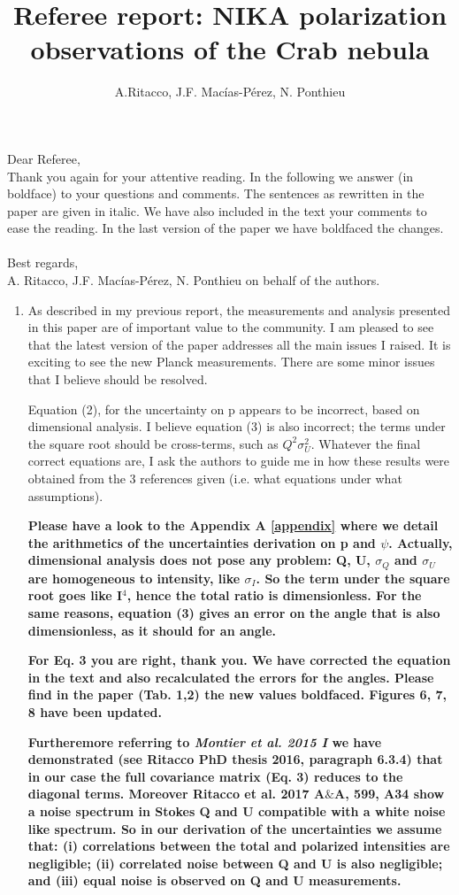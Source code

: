 \documentclass[12pt]{article}
\title{Referee report: NIKA polarization observations of the Crab nebula}
\author{A.Ritacco, J.F. Macías-Pérez, N. Ponthieu}
\begin{document}
\maketitle

\noindent Dear Referee,\\
Thank you again for your attentive reading. 
In the following we answer (in boldface) to your questions and comments.
The sentences as rewritten in the paper are given in italic.
We have also included in the text your comments to ease the reading. 
In the last version of the paper we have boldfaced the changes. \\  \\
Best regards,\\
A. Ritacco, J.F. Macías-Pérez, N. Ponthieu on behalf of the authors.


\begin{enumerate}
    \item 
{
As described in my previous report, the measurements and analysis 
presented in this paper are of important value to the community. I am 
pleased to see that the latest version of the paper addresses all the 
main issues I raised. It is exciting to see the new Planck 
measurements. There are some minor issues that I believe 
should be resolved. 
}

Equation (2), for the uncertainty on p appears to be incorrect, based 
on dimensional analysis. I believe equation (3) is also incorrect; 
the terms under the square root should be cross-terms, such as 
$Q^2\sigma_U^2$. Whatever the final correct equations are, I ask the 
authors to guide me in how these results were obtained from the 3 
references given (i.e. what equations under what assumptions).

{\bf Please have a look to the Appendix A \ref{appendix} where we detail the arithmetics of the uncertainties derivation on p and $\psi$. Actually, dimensional analysis does not pose any problem: Q, U, $\sigma_Q$ and $\sigma_U$ are homogeneous to intensity, like $\sigma_I$. So the term under the square root goes like I$^4$, hence the total ratio is dimensionless. For the same reasons, equation (3) gives an error on the angle that is also dimensionless, as it should for an angle.}

{\bf For Eq. 3 you are right, thank you. We have corrected the equation in the text and also recalculated the errors for the angles. Please find in the paper (Tab. 1,2) the new values boldfaced. Figures 6, 7, 8 have been updated.}

{\bf Furtheremore referring to {\it Montier et al. 2015 I} we have demonstrated (see Ritacco PhD thesis 2016, paragraph 6.3.4) that in our case the full covariance matrix (Eq. 3) reduces to the diagonal terms. Moreover Ritacco et al. 2017 A$\&$A, 599, A34 show a noise spectrum in Stokes Q and U compatible with a white noise like spectrum. So in our derivation of the uncertainties we assume that: (i) correlations between the total and polarized intensities are negligible; (ii) correlated noise between Q and U is also negligible; and (iii) equal noise is observed on Q and U measurements.}



\end{enumerate}
\end{document}
